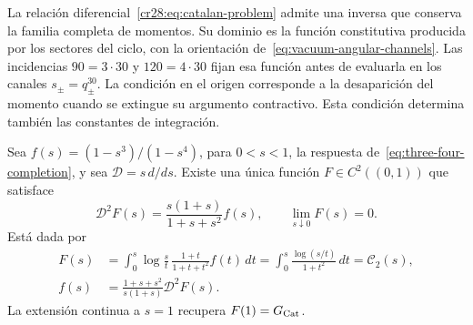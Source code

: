 La relación diferencial~\eqref{cr28:eq:catalan-problem} admite una
inversa que conserva la familia completa de momentos. Su dominio es
la función constitutiva producida por los sectores del ciclo, con la
orientación de~\eqref{eq:vacuum-angular-channels}. Las incidencias $90=3\cdot30$ y
$120=4\cdot30$ fijan esa función antes de evaluarla en los canales
$s_\pm=q_\pm^{30}$. La condición en el origen corresponde a la
desaparición del momento cuando se extingue su argumento contractivo.
Esta condición determina también las constantes de integración.

\begin{theorem}
\label{cr28:thm:catalan-recovery}
Sea $f(s)=(1-s^3)/(1-s^4)$, para $0<s<1$, la respuesta
de~\eqref{eq:three-four-completion}, y sea $\mathcal D=s\,d/ds$.
Existe una única función $F\in C^2((0,1))$ que satisface
\begin{equation}
 \mathcal D^2F(s)=\frac{s(1+s)}{1+s+s^2}f(s),
 \qquad \lim_{s\downarrow0}F(s)=0.
 \label{cr28:eq:catalan-problem}
\end{equation}
Está dada por
\begin{align}
 F(s)&=\int_0^s\log\frac{s}{t}\,
          \frac{1+t}{1+t+t^2}f(t)\,dt
       =\int_0^s\frac{\log(s/t)}{1+t^2}\,dt
       =\mathcal C_2(s),
 \label{cr28:eq:catalan-integral}\\
 f(s)&=\frac{1+s+s^2}{s(1+s)}\mathcal D^2F(s).
 \label{cr28:eq:catalan-inverse}
\end{align}
La extensión continua a $s=1$ recupera $F(1)=G_{\rm Cat}$.
\end{theorem}
